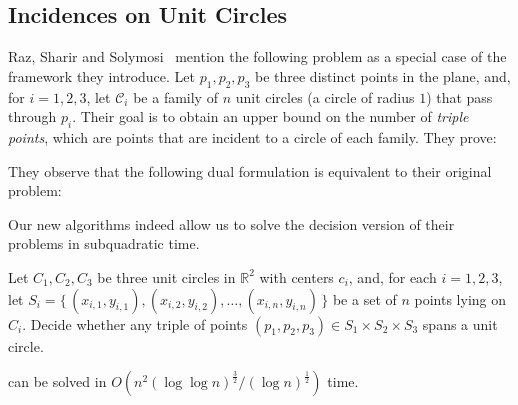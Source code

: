 \subsection{Incidences on Unit Circles}%
\label{sec:paper:3pol-algorithm:application:circles}

Raz, Sharir and Solymosi~\cite{RSS15} mention the following problem as a
special case of the framework they introduce.
Let $p_1,p_2,p_3$ be three distinct points in the plane, and, for $i=1,2,3$,
let $\mathcal{C}_i$ be a family of $n$ unit circles (a circle of radius $1$)
that pass through $p_i$.  Their goal is to obtain an upper bound on the number
of \emph{triple points}, which are points that are incident to a circle of each
family.
%
They prove:


They observe that the following dual formulation is equivalent to their
original problem:


Our new algorithms indeed allow us to solve the decision version of their
problems in subquadratic time.
\begin{problem}[%
	label=problem:UCSPTUC%
]
	Let $C_1,C_2,C_3$ be three unit circles in $\mathbb{R}^2$ with centers
	$c_i$, and, for each $i=1,2,3$, let $S_i =
	\{\,(x_{i,1},y_{i,1}),(x_{i,2},y_{i,2}),\ldots,(x_{i,n},y_{i,n})\,\}$ be a
	set of $n$ points lying on $C_i$. Decide whether any triple of points
	$(p_1,p_2,p_3) \in S_1 \times S_2 \times S_3$ spans a unit circle.
\end{problem}

\begin{theorem}
	 can be solved in
	$O(n^2 {(\log \log n)}^\frac{3}{2} / {(\log n)}^\frac{1}{2})$ time.
\end{theorem}


